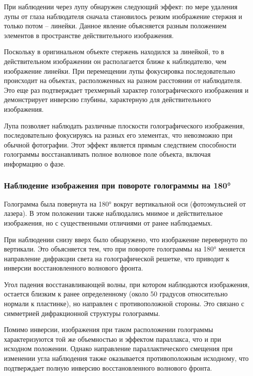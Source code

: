 При наблюдении через лупу обнаружен следующий эффект: по мере удаления лупы от глаза наблюдателя сначала становилось резким изображение стержня и только потом – линейки. Данное явление объясняется разным положением элементов в пространстве действительного изображения.

Поскольку в оригинальном объекте стержень находился за линейкой, то в действительном изображении он располагается ближе к наблюдателю, чем изображение линейки. При перемещении лупы фокусировка последовательно происходит на объектах, расположенных на разном расстоянии от наблюдателя. Это еще раз подтверждает трехмерный характер голографического изображения и демонстрирует инверсию глубины, характерную для действительного изображения.

Лупа позволяет наблюдать различные плоскости голографического изображения, последовательно фокусируясь на разных его элементах, что невозможно при обычной фотографии. Этот эффект является прямым следствием способности голограммы восстанавливать полное волновое поле объекта, включая информацию о фазе.

\subsubsection{Наблюдение изображения при повороте голограммы на 180°}

Голограмма была повернута на 180° вокруг вертикальной оси (фотоэмульсией от лазера). В этом положении также наблюдались мнимое и действительное изображения, но с существенными отличиями от ранее наблюдаемых.

При наблюдении снизу вверх было обнаружено, что изображение перевернуто по вертикали. Это объясняется тем, что при повороте голограммы на 180° меняется направление дифракции света на голографической решетке, что приводит к инверсии восстановленного волнового фронта.

Угол падения восстанавливающей волны, при котором наблюдаются изображения, остается близким к ранее определенному (около 50 градусов относительно нормали к пластинке), но направлен с противоположной стороны. Это связано с симметрией дифракционной структуры голограммы.

Помимо инверсии, изображения при таком расположении голограммы характеризуются той же объемностью и эффектом параллакса, что и при исходном положении. Однако направление параллактического смещения при изменении угла наблюдения также оказывается противоположным исходному, что подтверждает полную инверсию восстановленного волнового фронта.

